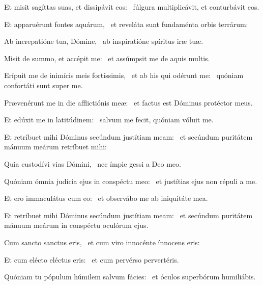 \item Et misit sagíttas suas, et dissipávit eos:~\psstar{} fúlgura multiplicávit, et conturbávit eos.

\item Et apparuérunt fontes aquárum,~\psstar{} et reveláta sunt fundaménta orbis terrárum:

\item Ab increpatióne tua, Dómine,~\psstar{} ab inspiratióne spíritus iræ tuæ.

\item Misit de summo, et accépit me:~\psstar{} et assúmpsit me de aquis multis.

\item Erípuit me de inimícis meis fortíssimis,~\pscross{} et ab his qui odérunt me:~\psstar{} quóniam confortáti sunt super me.

\item Prævenérunt me in die afflictiónis meæ:~\psstar{} et factus est Dóminus protéctor meus.

\item Et edúxit me in latitúdinem:~\psstar{} salvum me fecit, quóniam vóluit me.

\item Et retríbuet mihi Dóminus secúndum justítiam meam:~\psstar{} et secúndum puritátem mánuum meárum retríbuet mihi:

\item Quia custodívi vias Dómini,~\psstar{} nec ímpie gessi a Deo meo.

\item Quóniam ómnia judícia ejus in conspéctu meo:~\psstar{} et justítias ejus non répuli a me.

\item Et ero immaculátus cum eo:~\psstar{} et observábo me ab iniquitáte mea.

\item Et retríbuet mihi Dóminus secúndum justítiam meam:~\psstar{} et secúndum puritátem mánuum meárum in conspéctu oculórum ejus.

\item Cum sancto sanctus eris,~\psstar{} et cum viro innocénte ínnocens eris:

\item Et cum elécto eléctus eris:~\psstar{} et cum pervérso pervertéris.

\item Quóniam tu pópulum húmilem salvum fácies:~\psstar{} et óculos superbórum humiliábis.

